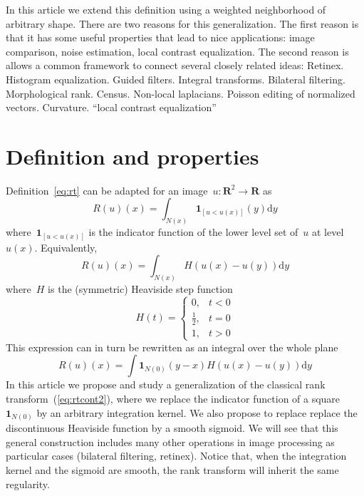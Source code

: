 \documentclass[12pt]{article}                  %
\begin{document}
In this article we extend this definition using a weighted neighborhood of
arbitrary shape.
There are two reasons for this generalization.
The first reason is that it has some useful properties that lead to nice
applications: image comparison, noise estimation, local contrast
equalization.
The second reason is allows a common framework to connect several closely
related ideas:
Retinex.  Histogram equalization.  Guided filters.  Integral transforms.
Bilateral filtering.
Morphological rank.  Census.  Non-local laplacians.  Poisson editing of
normalized vectors.  Curvature. ``local contrast equalization''
\clearpage


\section{Definition and properties}

Definition~\ref{eq:rt} can be adapted for an
image~$u:\mathbf{R}^2\to\mathbf{R}$ as
\begin{equation}\label{eq:rtcont}
	R(u)(x) = \int_{N(x)}\mathbf{1}_{\left[u < u(x)\right]}(y)\mathrm{d}y
\end{equation}
where~$\mathbf{1}_{\left[u < u(x)\right]}$ is the indicator function of the
lower level set of~$u$ at level~$u(x)$.  Equivalently,
\begin{equation}\label{eq:rtcont}
	R(u)(x) = \int_{N(x)}H(u(x)-u(y))\mathrm{d}y
\end{equation}
where~$H$ is the (symmetric) Heaviside step function
\begin{equation}\label{eq:heaviside}
	H(t)=\begin{cases}
		0,&t< 0\\
		\frac12,&t=0\\
		1,& t>0
\end{cases}
\end{equation}
This expression can in turn be rewritten as an integral over the whole plane
\begin{equation}\label{eq:rtcont2}
	R(u)(x) = \int\mathbf{1}_{N(0)}(y-x)H(u(x)-u(y))\mathrm{d}y
\end{equation}
In this article we propose and study a generalization of the classical rank
transform~(\ref{eq:rtcont2}), where we replace the indicator function of a
square~$\mathbf{1}_{N(0)}$ by an arbitrary integration kernel.
We also propose to replace
replace the discontinuous Heaviside function by a smooth sigmoid.
We will see that this general construction includes many other operations in
image processing as particular cases (bilateral filtering, retinex).
Notice that, when the integration kernel and the sigmoid are smooth, the
rank transform will inherit the same regularity.
\end{document}
